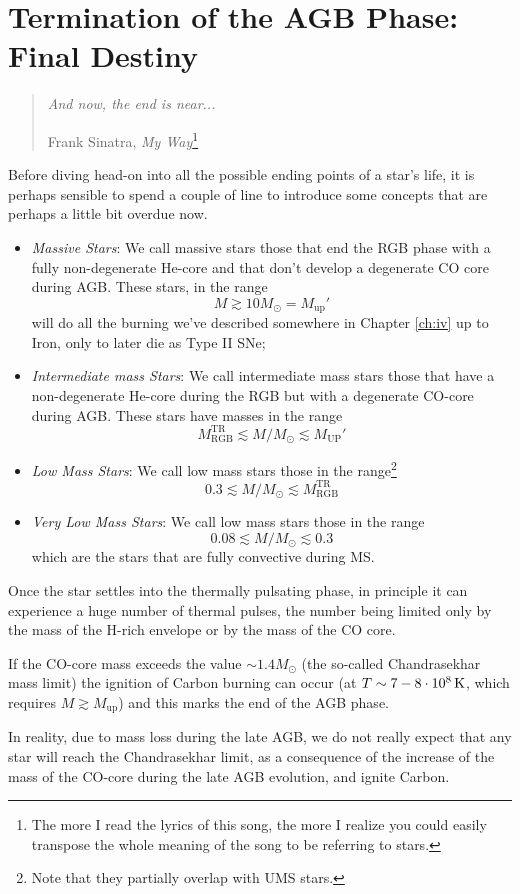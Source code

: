 \section{Termination of the AGB Phase: Final Destiny}

\begin{quote}
    \emph{And now, the end is near...}
    \begin{flushright}
        Frank Sinatra, \emph{My Way}\footnote{The more I read the lyrics of this song, the more I realize you could easily transpose the whole meaning of the song to be referring to stars.}
    \end{flushright}
\end{quote}

Before diving head-on into all the possible ending points of a star's life, it is perhaps sensible to spend a couple of line to introduce some concepts that are perhaps a little bit overdue now.
\begin{itemize}
    \item \emph{Massive Stars}: We call massive stars those that end the RGB phase with a fully non-degenerate He-core and that don't develop a degenerate CO core during AGB. These stars, in the range $$M \gtrsim 10M_{\odot} = M_{\text{up}}'$$ will do all the burning we've described somewhere in Chapter \ref{ch:iv} up to Iron, only to later die as Type II SNe;
    \item \emph{Intermediate mass Stars}: We call intermediate mass stars those that have a non-degenerate He-core during the RGB but with a degenerate CO-core during AGB. These stars have masses in the range $$M_{\text{RGB}}^{\text{TR}}\lesssim M/M_{\odot} \lesssim M_{\text{UP}}'$$
    \item \emph{Low Mass Stars}: We call low mass stars those in the range\footnote{Note that they partially overlap with UMS stars.} $$0.3\lesssim M/M_{\odot} \lesssim M_{\text{RGB}}^{\text{TR}}$$
    \item \emph{Very Low Mass Stars}: We call low mass stars those in the range $$0.08\lesssim M/M_{\odot}\lesssim 0.3$$ which are the stars that are fully convective during MS.
\end{itemize} 
Once the star settles into the thermally pulsating phase, in principle it can experience a huge number of thermal pulses, the number being limited only by the mass of the H-rich envelope or by the mass of the CO core.
\par If the CO-core mass exceeds the value $\sim 1.4M_{\odot}$ (the so-called Chandrasekhar mass limit) the ignition of Carbon burning can occur (at $T \sim 7-8\cdot 10^{8}\,\text{K}$, which requires $M \gtrsim M_{\text{up}}$) and this marks the end of the AGB phase.
\par In reality, due to mass loss during the late AGB, we do not really expect that any star will reach the Chandrasekhar limit, as a consequence of the increase of the mass of the CO-core during the late AGB evolution, and ignite Carbon.


